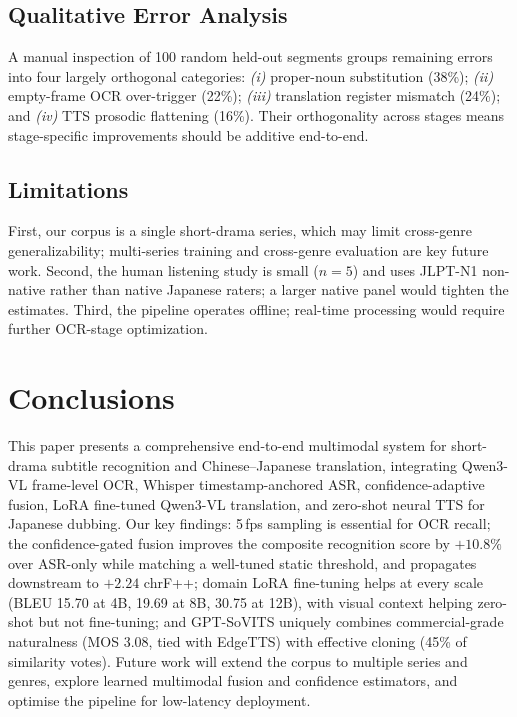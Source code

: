 \documentclass[mathematics,article,submit,xetex,moreauthors]{Definitions/mdpi}
\begin{document}
\subsection{Qualitative Error Analysis}
A manual inspection of 100 random held-out segments groups remaining errors into four largely orthogonal categories: \emph{(i)} proper-noun substitution (38\%); \emph{(ii)} empty-frame OCR over-trigger (22\%); \emph{(iii)} translation register mismatch (24\%); and \emph{(iv)} TTS prosodic flattening (16\%).
Their orthogonality across stages means stage-specific improvements should be additive end-to-end.

\subsection{Limitations}
First, our corpus is a single short-drama series, which may limit cross-genre generalizability; multi-series training and cross-genre evaluation are key future work.
Second, the human listening study is small ($n=5$) and uses JLPT-N1 non-native rather than native Japanese raters; a larger native panel would tighten the estimates.
Third, the pipeline operates offline; real-time processing would require further OCR-stage optimization.

\section{Conclusions}
\label{sec:conclusion}
This paper presents a comprehensive end-to-end multimodal system for short-drama subtitle recognition and Chinese--Japanese translation, integrating Qwen3-VL frame-level OCR, Whisper timestamp-anchored ASR, confidence-adaptive fusion, LoRA fine-tuned Qwen3-VL translation, and zero-shot neural TTS for Japanese dubbing.
Our key findings: 5\,fps sampling is essential for OCR recall; the confidence-gated fusion improves the composite recognition score by $+10.8\%$ over ASR-only while matching a well-tuned static threshold, and propagates downstream to $+2.24$ chrF++; domain LoRA fine-tuning helps at every scale (BLEU 15.70 at 4B, 19.69 at 8B, 30.75 at 12B), with visual context helping zero-shot but not fine-tuning; and GPT-SoVITS uniquely combines commercial-grade naturalness (MOS 3.08, tied with EdgeTTS) with effective cloning (45\% of similarity votes).
Future work will extend the corpus to multiple series and genres, explore learned multimodal fusion and confidence estimators, and optimise the pipeline for low-latency deployment.
\end{document}
